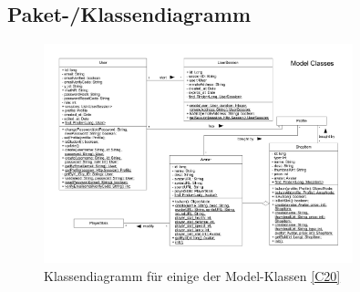 \subsection{Paket-/Klassendiagramm}
\begin{figure}[h!]
\centering
\includegraphics[width=0.8\textwidth]{figures/KDUserAndAvatar}
\caption{Klassendiagramm für einige der Model-Klassen \ref{C20}}
\label{classC10}
\end{figure}
\clearpage
